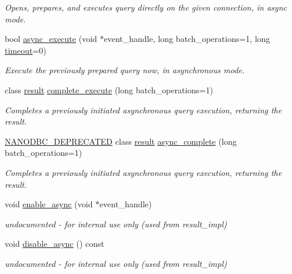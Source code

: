 \begin{DoxyCompactItemize}
\begin{DoxyCompactList}\small\item\em Opens, prepares, and executes query directly on the given connection, in async mode. \end{DoxyCompactList}\item 
bool \mbox{\hyperlink{classnanodbc_1_1statement_ac7086dafc8c0f014c629d15f97cc9505}{async\+\_\+execute}} (void $\ast$event\+\_\+handle, long batch\+\_\+operations=1, long \mbox{\hyperlink{classnanodbc_1_1statement_adbd1acbbdcc529dc668bfef341593573}{timeout}}=0)
\begin{DoxyCompactList}\small\item\em Execute the previously prepared query now, in asynchronous mode. \end{DoxyCompactList}\item 
class \mbox{\hyperlink{classnanodbc_1_1result}{result}} \mbox{\hyperlink{classnanodbc_1_1statement_aa4a0bb3fc0112469e837e1acd5ef3f6a}{complete\+\_\+execute}} (long batch\+\_\+operations=1)
\begin{DoxyCompactList}\small\item\em Completes a previously initiated asynchronous query execution, returning the result. \end{DoxyCompactList}\item 
\mbox{\hyperlink{nanodbc_8hpp_a19335d16a1c69aa9d7b948100c4847ab}{N\+A\+N\+O\+D\+B\+C\+\_\+\+D\+E\+P\+R\+E\+C\+A\+T\+ED}} class \mbox{\hyperlink{classnanodbc_1_1result}{result}} \mbox{\hyperlink{classnanodbc_1_1statement_ab5498ba941c04dfe1e7e47928161b0e5}{async\+\_\+complete}} (long batch\+\_\+operations=1)
\begin{DoxyCompactList}\small\item\em Completes a previously initiated asynchronous query execution, returning the result. \end{DoxyCompactList}\item 
void \mbox{\hyperlink{classnanodbc_1_1statement_ada8ceb1d90ebe7c0a876a185fa89f009}{enable\+\_\+async}} (void $\ast$event\+\_\+handle)
\begin{DoxyCompactList}\small\item\em undocumented -\/ for internal use only (used from result\+\_\+impl) \end{DoxyCompactList}\item 
void \mbox{\hyperlink{classnanodbc_1_1statement_a7b96b992fb9891b46411c300b017fe74}{disable\+\_\+async}} () const
\begin{DoxyCompactList}\small\item\em undocumented -\/ for internal use only (used from result\+\_\+impl) \end{DoxyCompactList}\item 

\end{DoxyCompactItemize}

